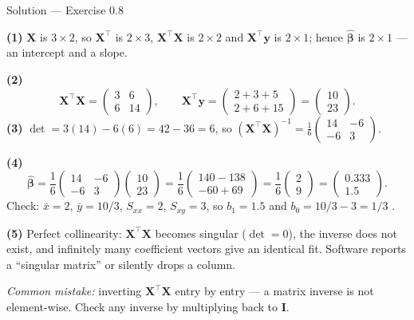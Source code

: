 \documentclass[aspectratio=169,11pt]{beamer}
\begin{document}
\begin{frame}{Solution --- Exercise 0.8}
  \begin{solutionbox}
    \textbf{(1)} $\mathbf{X}$ is $3\times2$, so $\mathbf{X}^\top$ is
    $2\times3$, $\mathbf{X}^\top\mathbf{X}$ is $2\times2$ and
    $\mathbf{X}^\top\mathbf{y}$ is $2\times1$; hence
    $\hat{\boldsymbol\beta}$ is $2\times1$ --- an intercept and a slope.

    \textbf{(2)}
    \[
      \mathbf{X}^\top\mathbf{X}
      = \begin{pmatrix} 3 & 6 \\ 6 & 14 \end{pmatrix},
      \qquad
      \mathbf{X}^\top\mathbf{y}
      = \begin{pmatrix} 2+3+5 \\ 2+6+15 \end{pmatrix}
      = \begin{pmatrix} 10 \\ 23 \end{pmatrix}.
    \]
    \textbf{(3)} $\det = 3(14) - 6(6) = 42 - 36 = 6$, so
    $(\mathbf{X}^\top\mathbf{X})^{-1}
      = \frac{1}{6}\begin{pmatrix} 14 & -6 \\ -6 & 3\end{pmatrix}$.

    \textbf{(4)}
    \[
      \hat{\boldsymbol\beta} = \frac{1}{6}
      \begin{pmatrix} 14 & -6 \\ -6 & 3\end{pmatrix}
      \begin{pmatrix} 10 \\ 23 \end{pmatrix}
      = \frac{1}{6}\begin{pmatrix} 140-138 \\ -60+69 \end{pmatrix}
      = \frac{1}{6}\begin{pmatrix} 2 \\ 9 \end{pmatrix}
      = \begin{pmatrix} 0.333 \\ 1.5 \end{pmatrix}.
    \]
    Check: $\bar x = 2$, $\bar y = 10/3$, $S_{xx} = 2$, $S_{xy} = 3$, so
    $b_1 = 1.5$ \checkmark and $b_0 = 10/3 - 3 = 1/3$ \checkmark.

    \textbf{(5)} Perfect collinearity: $\mathbf{X}^\top\mathbf{X}$ becomes
    singular ($\det = 0$), the inverse does not exist, and infinitely many
    coefficient vectors give an identical fit. Software reports a ``singular
    matrix'' or silently drops a column.

    \textit{Common mistake:} inverting $\mathbf{X}^\top\mathbf{X}$ entry by
    entry --- a matrix inverse is not element-wise. Check any inverse by
    multiplying back to $\mathbf{I}$.
  \end{solutionbox}
\end{frame}
\end{document}
